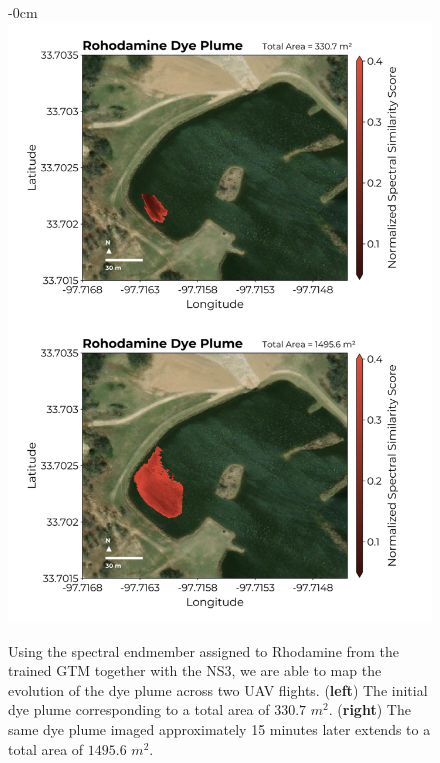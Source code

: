 \documentclass[remotesensing,article,submit,pdftex,moreauthors]{Definitions/mdpi}
\begin{document}
\begin{figure}
\begin{adjustwidth}{-\extralength}{0cm}
\centering
\includegraphics[width=14.5cm]{paper/figures/results/rhodamine-vertical.png}
\end{adjustwidth}
\caption{Using the spectral endmember assigned to Rhodamine from the trained GTM together with the NS3, we are able to map the evolution of the dye plume across two UAV flights. (\textbf{left}) The initial dye plume corresponding to a total area of $330.7$ $m^2$. (\textbf{right}) The same dye plume imaged approximately 15 minutes later extends to a total area of $1495.6$ $m^2$.\label{fig:rhodamine-map}}
\end{figure}  

\newpage



\end{document}
